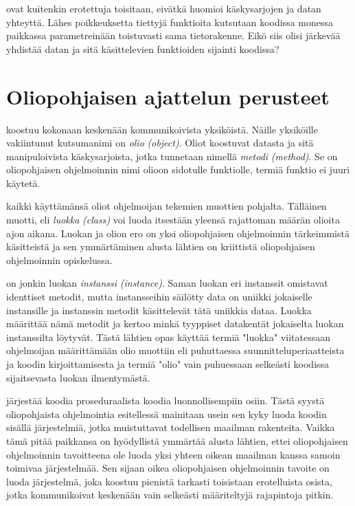 \documentclass{tufte-book}
\newcommand{\eng}[1]{\textit{(#1)}}
\newcommand{\new}[1]{\textit{\gls{#1}}}
\newcommand{\neweng}[2]{\new{#1} \eng{#2}}
\begin{document}
 ovat kuitenkin erotettuja toisitaan, eivätkä huomioi
käskysarjojen ja datan yhteyttä. Lähes poikkeuksetta tiettyjä funktioita kutsutaan koodissa
monessa paikkassa parametreinään toistuvasti sama tietorakenne. Eikö siis olisi järkevää yhdistää
datan ja sitä käsittelevien funktioiden sijainti koodissa?


\section{Oliopohjaisen ajattelun perusteet}
\label{oliopohjaisesta ajattelusta}

 koostuu kokonaan keskenään kommunikoivista yksiköistä.
Näille yksiköille vakiintunut kutsumanimi on \neweng{olio}{object}. Oliot koostuvat datasta ja
sitä manipuloivista käskysarjoista, jotka tunnetaan nimellä \neweng{metodi}{method}. Se on
oliopohjaisen ohjelmoinnin nimi olioon sidotulle funktiolle, termiä \gls{funktio} ei juuri
käytetä.

 kaikki käyttämänsä oliot ohjelmoijan tekemien muottien pohjalta.
Tälläinen muotti, eli \neweng{luokka}{class} voi luoda itsestään yleensä rajattoman määrän olioita
ajon aikana. Luokan ja olion ero on yksi oliopohjaisen ohjelmoinnin tärkeimmistä käsitteistä ja
sen ymmärtäminen alusta lähtien on kriittistä oliopohjaisen ohjelmoinnin opiskelussa.

 on jonkin luokan \neweng{instanssi}{instance}. Saman luokan eri
instanssit omistavat identtiset metodit, mutta instansseihin säilötty data on uniikki jokaiselle
instansille ja instanssin metodit käsittelevät tätä uniikkia dataa. Luokka määrittää nämä metodit
ja kertoo minkä tyyppiset datakentät jokaiselta luokan instanssilta löytyvät. Tästä lähtien
opas käyttää termiä "luokka" viitatessaan ohjelmoijan määrittämään olio muottiin eli puhuttaessa
suunnitteluperiaatteista ja koodin kirjoittamisesta ja termiä "olio" vain puhuessaan selkeästi
koodissa sijaitsevasta luokan ilmentymästä.

 järjestää koodia proseduraalista koodia luonnollisempiin osiin.
Tästä syystä oliopohjaista ohjelmointia esitellessä mainitaan usein sen kyky luoda koodin sisällä
järjestelmiä, jotka muistuttavat todellisen maailman rakenteita. Vaikka tämä pitää paikkansa on
hyödyllistä ymmärtää alusta lähtien, ettei oliopohjaisen ohjelmoinnin tavoitteena ole luoda yksi
yhteen oikean maailman kanssa samoin toimivaa järjestelmää. Sen sijaan oikea oliopohjaisen
ohjelmoinnin tavoite on luoda järjestelmä, joka koostuu pienistä tarkasti toisistaan erotelluista
osista, jotka kommunikoivat keskenään vain selkeästi määriteltyjä rajapintoja pitkin.
\end{document}
